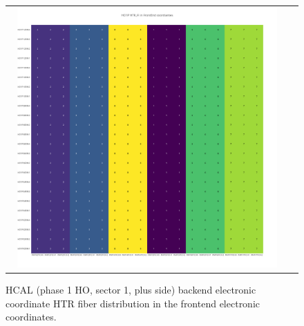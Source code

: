 \begin{figure}[htb]
 \begin{center}
  \begin{tabular}{cc}
   \includegraphics[angle=0,width=0.95\textwidth]{figures/appendix/HO1P_HTR_FI_in_FrontEnd.png}
  \end{tabular}
  \caption{HCAL (phase 1 HO, sector 1, plus side) backend electronic coordinate HTR fiber distribution in the frontend electronic coordinates.}
  \label{fig:lmapHO1PHTRFIFEC}
 \end{center}
\end{figure}
\clearpage

